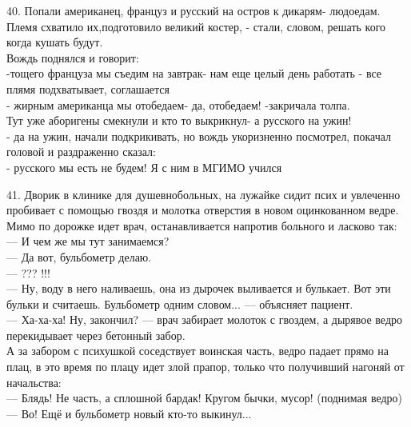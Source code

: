 \documentclass[a4paper,20pt,notitlepage]{extbook}
\begin{document}
	40. Попали американец, француз и русский на остров к дикарям- людоедам. \\
	Племя схватило их,подготовило великий костер, - стали, словом, решать кого когда кушать будут.\\
	Вождь поднялся и говорит:\\
	-тощего француза мы съедим на завтрак- нам еще целый день работать
	 - все плямя подхватывает, соглашается\\
	- жирным американца мы отобедаем- да, отобедаем! -закричала толпа.\\
	Тут уже аборигены смекнули и кто то выкрикнул- а русского на ужин! \\
	- да на ужин, начали подкрикивать, но вождь укоризненно посмотрел, покачал головой и раздраженно сказал:\\
	- русского мы есть не будем! Я с ним в МГИМО учился
	
	41. Дворик в клинике для душевнобольных, на лужайке сидит псих и увлеченно пробивает с помощью гвоздя и молотка отверстия в новом оцинкованном ведре.\\
	 Мимо по дорожке идет врач, останавливается напротив больного и ласково так:\\
	— И чем же мы тут занимаемся?\\
	— Да вот, бульбометр делаю.\\
	— ??? !!!\\
	— Ну, воду в него наливаешь, она из дырочек выливается и булькает. Вот эти бульки и считаешь. Бульбометр одним словом... — объясняет пациент.\\
	— Ха-ха-ха! Ну, закончил? — врач забирает молоток с гвоздем, а дырявое ведро перекидывает через бетонный забор.\\
	А за забором с психушкой соседствует воинская часть, ведро падает прямо на плац, в это время по плацу идет злой прапор, только что получивший нагоняй от начальства:\\
	— Блядь! Не часть, а сплошной бардак! Кругом бычки, мусор! (поднимая ведро)\\
	— Во! Ещё и бульбометр новый кто-то выкинул...\\
	
\end{document}
